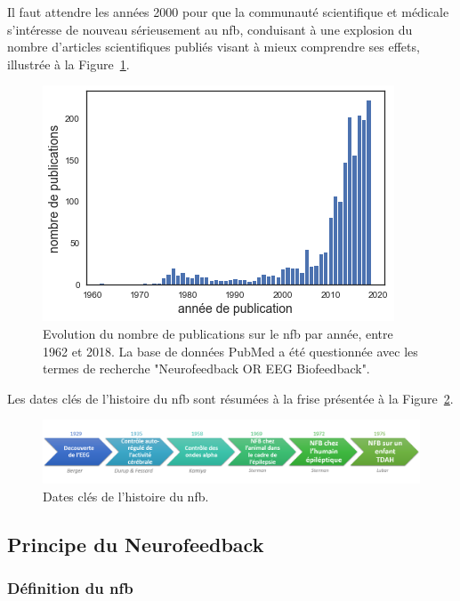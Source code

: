 Il faut attendre les années 2000 pour que la communauté scientifique et médicale s'intéresse de nouveau sérieusement au \gls{nfb}, conduisant à une explosion du nombre d'articles scientifiques publiés 
visant à mieux comprendre ses effets, illustrée à la Figure~\ref{Figure:introduction_number_of_nfb_publications}. 

\begin{figure}[h!]
  \centering
	\includegraphics[width=0.7\linewidth]{figures/chapter-1/introduction-number-of-nfb-publications} 
  \caption{Evolution du nombre de publications sur le \gls{nfb} par année, entre 1962 et 2018. La base de données PubMed a été questionnée avec les 
	termes de recherche "Neurofeedback OR EEG Biofeedback".}
  \label{Figure:introduction_number_of_nfb_publications}
\end{figure}

Les dates clés de l'histoire du \gls{nfb} sont résumées à la frise présentée à la Figure~\ref{Figure:introduction_nfb_history}.

\begin{figure}[h!]
  \centering
	\includegraphics[width=1\linewidth]{figures/chapter-1/introduction-nfb-history} 
  \caption{Dates clés de l'histoire du \gls{nfb}.}
  \label{Figure:introduction_nfb_history}
\end{figure}

\subsection{Principe du Neurofeedback} \label{principe_nfb}

\subsubsection{Définition du \gls{nfb}}


